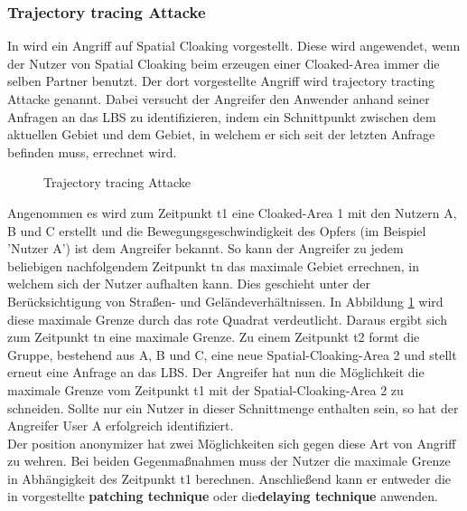 \subsubsection{Trajectory tracing Attacke} 
In \cite{chow2011} wird ein Angriff auf Spatial Cloaking vorgestellt. Diese wird angewendet, wenn der Nutzer von Spatial Cloaking beim erzeugen einer Cloaked-Area immer die selben Partner benutzt. Der dort vorgestellte Angriff wird trajectory tracting Attacke genannt. Dabei versucht der Angreifer den Anwender anhand seiner Anfragen an das LBS zu identifizieren, indem ein Schnittpunkt zwischen dem aktuellen Gebiet und dem Gebiet, in welchem er sich seit der letzten Anfrage befinden muss, errechnet wird. 
\begin{figure}[!h]
		\centering
		\caption{Trajectory tracing Attacke}
		\label{fig_chow2011_traj-tracing-att}
	\end{figure}
Angenommen es wird zum Zeitpunkt t1 eine Cloaked-Area 1 mit den Nutzern A, B und C erstellt und die Bewegungsgeschwindigkeit des Opfers (im Beispiel 'Nutzer A') ist dem Angreifer bekannt. So kann der Angreifer zu jedem beliebigen nachfolgendem Zeitpunkt tn das maximale Gebiet errechnen, in welchem sich der Nutzer aufhalten kann. Dies geschieht unter der Berücksichtigung von Straßen- und Geländeverhältnissen. In Abbildung \ref{fig_chow2011_traj-tracing-att} wird diese maximale Grenze durch das rote Quadrat verdeutlicht. Daraus ergibt sich zum Zeitpunkt tn eine maximale Grenze. Zu einem Zeitpunkt t2 formt die Gruppe, bestehend aus A, B und C, eine neue Spatial-Cloaking-Area 2 und stellt erneut eine Anfrage an das LBS. Der Angreifer hat nun die Möglichkeit die maximale Grenze vom Zeitpunkt t1 mit der Spatial-Cloaking-Area 2 zu schneiden. Sollte nur ein Nutzer in dieser Schnittmenge enthalten sein, so hat der Angreifer User A erfolgreich identifiziert.\\  Der position anonymizer hat zwei Möglichkeiten sich gegen diese Art von Angriff zu wehren. Bei beiden Gegenmaßnahmen muss der Nutzer die maximale Grenze in Abhängigkeit des Zeitpunkt t1 berechnen. Anschließend kann er entweder die in \cite{Chow2011} vorgestellte \textbf{patching technique} oder die\textbf{delaying technique} anwenden. 
